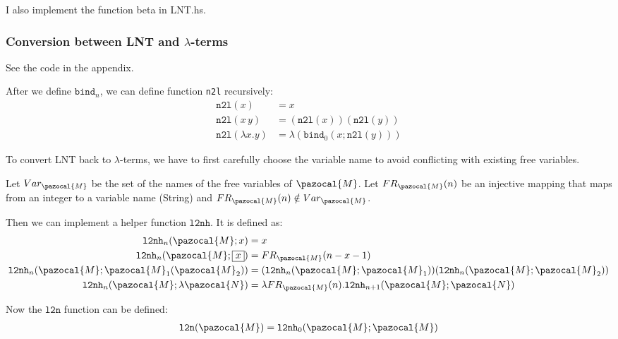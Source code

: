 \documentclass{article}
\theoremstyle{definition}
\newcommand{\lb}{$\lambda$}
\begin{document}
I also implement the function \textsf{beta} in \textsf{LNT.hs}.

\subsubsection*{Conversion between LNT and \lb-terms}

See the code in the appendix.

After we define $\mathtt{bind}_n$, we can define function \texttt{n2l} recursively:
\begin{align*}
    \mathtt{n2l}(x)           & = x                                            \\
    \mathtt{n2l}(x\, y)       & = (\mathtt{n2l}(x))(\mathtt{n2l}(y))           \\
    \mathtt{n2l}(\lambda x.y) & = \lambda (\mathtt{bind}_0(x;\mathtt{n2l}(y)))
\end{align*}

To convert LNT back to \lb-terms, we have to first carefully choose the variable name to avoid conflicting with existing free variables.

Let $Var_\pazocal{M}$ be the set of the names of the free variables of $\pazocal{M}$.
Let $FR_\pazocal{M}(n)$ be an injective mapping that maps from an integer to a variable name (String) and $FR_\pazocal{M}(n)\notin Var_\pazocal{M}$.

Then we can implement a helper function $\mathtt{l2nh}$.
It is defined as:
\begin{align*}
    \mathtt{l2nh}_n(\pazocal{M};x)                            & = x                                                                                        \\
    \mathtt{l2nh}_n(\pazocal{M};\fbox{$x$})                   & = FR_\pazocal{M}(n - x -1)                                                                 \\
    \mathtt{l2nh}_n(\pazocal{M};\pazocal{M}_1(\pazocal{M}_2)) & = (\mathtt{l2nh}_n(\pazocal{M};\pazocal{M}_1))(\mathtt{l2nh}_n(\pazocal{M};\pazocal{M}_2)) \\
    \mathtt{l2nh}_n(\pazocal{M};\lambda \pazocal{N})          & = \lambda FR_\pazocal{M}(n).\mathtt{l2nh}_{n+1}(\pazocal{M};\pazocal{N})                   \\
\end{align*}

Now the $\mathtt{l2n}$ function can be defined:
\begin{align*}
    \mathtt{l2n}(\pazocal{M}) = \mathtt{l2nh}_0(\pazocal{M};\pazocal{M})
\end{align*}
\end{document}
